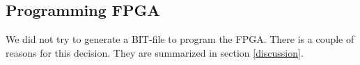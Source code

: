 \subsection{Programming FPGA}
We did not try to generate a BIT-file to program the FPGA. There is a couple
of reasons for this decision. They are summarized in section 
\ref{discussion}.
